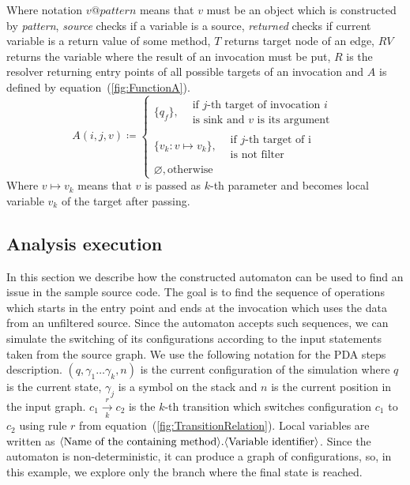 Where notation $v@\textit{pattern}$ means that $v$ must be an object which is constructed by \textit{pattern}, \textit{source} checks if a variable is a source, \textit{returned} checks if current variable is a return value of some method, $T$ returns target node of an edge, $RV$ returns the variable where the result of an invocation must be put, $R$ is the resolver returning entry points of all possible targets of an invocation and $A$ is defined by equation~(\ref{fig:FunctionA}).
\begin{equation}
    \label{fig:FunctionA}
    A(i, j, v) \coloneqq
    \begin{cases}
        \{q_f\},  \begin{split}&\textrm{if $j$-th target of invocation $i$} \\ & \textrm{is sink and $v$ is its argument}\end{split} \\
            \{v_k: v \mapsto v_k\}, \begin{split}&\textrm{if $j$-th target of i} \\ & \textrm{is not filter}\end{split} \\
        \varnothing, \textrm{otherwise}
    \end{cases}
\end{equation}
Where $v \mapsto v_k$ means that $v$ is passed as $k$-th parameter and becomes local variable $v_k$ of the target after passing.

\subsection{Analysis execution}

In this section we describe how the constructed automaton can be used to find an issue in the sample source code.
The goal is to find the sequence of operations which starts in the entry point and ends at the invocation which uses the data from an unfiltered source.
Since the automaton accepts such sequences, we can simulate the switching of its configurations according to the input statements taken from the source graph.
We use the following notation for the PDA steps description.
$(q, \gamma_1 \ldots \gamma_k, n)$ is the current configuration of the simulation where $q$ is the current state, $\gamma_j$ is a symbol on the stack and $n$ is the current position in the input graph.
$c_1 \xrightarrow[k]{r} c_2$ is the $k$-th transition which switches configuration $c_1$ to $c_2$ using rule $r$ from equation~(\ref{fig:TransitionRelation}).
Local variables are written as $\text{\textlangle{}Name of the containing method\textrangle{}}.\text{\textlangle{}Variable identifier\textrangle{}}$.
Since the automaton is non-deterministic, it can produce a graph of configurations, so, in this example, we explore only the branch where the final state is reached.

